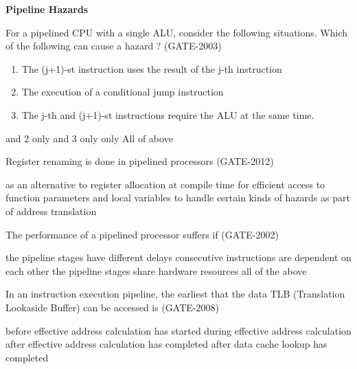 
\centerline{\textbf{ \LARGE Pipeline Hazards}}


\begin{questyle}
  \question  For a pipelined CPU with a single ALU, consider the following situations. Which of the
            following can cause a hazard ?  (GATE-2003)

  \begin{enumerate}
    \item The (j+1)-st instruction uses the result of the j-th instruction
    \item The execution of a conditional jump instruction
    \item The j-th and (j+1)-st instructions require the ALU at the same time.
  \end{enumerate}

  \begin{oneparchoices}
     and 2 only
     and 3 only
     only
    \CorrectChoice  All of above
  \end{oneparchoices}
\end{questyle}


\begin{questyle}
  \question  Register renaming is done in pipelined processors  (GATE-2012)

  \begin{choices}
    \choice         as an alternative to register allocation at compile time
    \choice         for efficient access to function parameters and local variables
    \CorrectChoice  to handle certain kinds of hazards
    \choice         as part of address translation
  \end{choices}
\end{questyle}


\begin{questyle}
  \question  The performance of a pipelined processor suffers if  (GATE-2002)

  \begin{choices}
    \choice         the pipeline stages have different delays
    \choice         consecutive instructions are dependent on each other
    \choice         the pipeline stages share hardware resources
    \CorrectChoice  all of the above
  \end{choices}
\end{questyle}


\begin{questyle}
  \question  In an instruction execution pipeline, the earliest that the data TLB (Translation Lookaside Buffer)
            can be accessed is  (GATE-2008)

  \begin{choices}
    \choice         before effective address calculation has started
    \choice         during effective address calculation
    \CorrectChoice  after effective address calculation has completed
    \choice         after data cache lookup has completed
  \end{choices}
\end{questyle}

